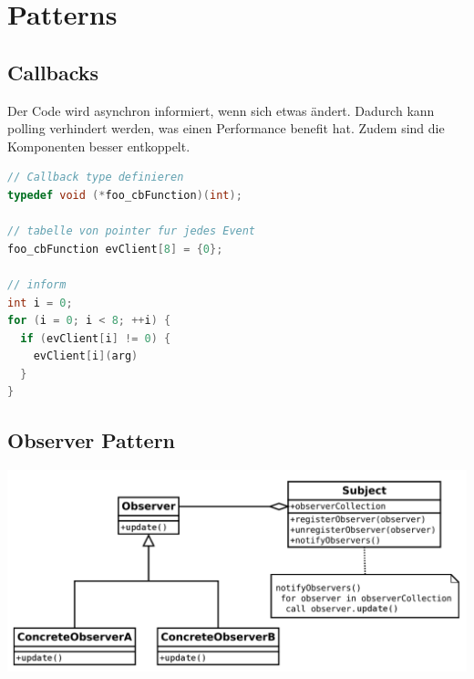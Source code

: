 \section{Patterns}
\subsection{Callbacks}
Der Code wird asynchron informiert, wenn sich etwas ändert. Dadurch kann polling verhindert werden, was einen Performance benefit hat. Zudem 
sind die Komponenten besser entkoppelt.
\begin{lstlisting}[language=c]
// Callback type definieren
typedef void (*foo_cbFunction)(int);

// tabelle von pointer fur jedes Event
foo_cbFunction evClient[8] = {0};

// inform
int i = 0;
for (i = 0; i < 8; ++i) {
  if (evClient[i] != 0) {
    evClient[i](arg)	
  }
}
\end{lstlisting}

\subsection{Observer Pattern}
\begin{center}
	\includegraphics[width=\columnwidth]{Images/observer}
\end{center}

